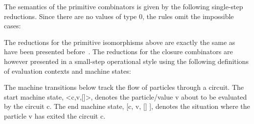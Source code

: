\documentclass[preprint]{sigplanconf}
\begin{document}
The semantics of the primitive combinators is given by the following
single-step reductions. Since there are no values of type {{0}}, the rules
omit the impossible cases:
\begin{scriptsize}
\end{scriptsize}
The reductions for the primitive isomorphisms above are exactly the same as
have been presented before~\cite{infeffects}. The reductions for the closure
combinators are however presented in a small-step operational style using the
following definitions of evaluation contexts and machine states:

\begin{scriptsize}
\end{scriptsize}
The machine transitions below track the flow of particles through a
circuit. The start machine state, {{<c,v,[]>}}, denotes the particle/value
{{v}} about to be evaluated by the circuit {{c}}. The end machine state,
{{[c, v, [] ]}}, denotes the situation where the particle {{v}} has exited
the circuit {{c}}.
\end{document}
